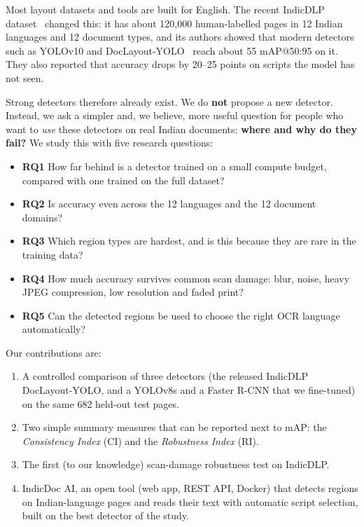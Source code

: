 \documentclass[conference]{IEEEtran}
\begin{document}
Most layout datasets and tools are built for English. The recent IndicDLP dataset~\cite{indicdlp} changed this: it
has about 120{,}000 human-labelled pages in 12 Indian languages and 12 document types, and its authors showed that
modern detectors such as YOLOv10 and DocLayout-YOLO~\cite{doclayout} reach about 55 mAP@50:95 on it. They also
reported that accuracy drops by 20--25 points on scripts the model has not seen.

Strong detectors therefore already exist. We do \textbf{not} propose a new detector. Instead, we ask a simpler
and, we believe, more useful question for people who want to \emph{use} these detectors on real Indian documents:
\textbf{where and why do they fail?} We study this with five research questions:
\begin{itemize}
\item \textbf{RQ1} How far behind is a detector trained on a small compute budget, compared with one trained on the full dataset?
\item \textbf{RQ2} Is accuracy even across the 12 languages and the 12 document domains?
\item \textbf{RQ3} Which region types are hardest, and is this because they are rare in the training data?
\item \textbf{RQ4} How much accuracy survives common scan damage: blur, noise, heavy JPEG compression, low resolution and faded print?
\item \textbf{RQ5} Can the detected regions be used to choose the right OCR language automatically?
\end{itemize}

\noindent Our contributions are:
\begin{enumerate}
\item A controlled comparison of three detectors (the released IndicDLP DocLayout-YOLO, and a YOLOv8s and a Faster
R-CNN that we fine-tuned) on the same 682 held-out test pages.
\item Two simple summary measures that can be reported next to mAP: the \emph{Consistency Index} (CI) and the
\emph{Robustness Index} (RI).
\item The first (to our knowledge) scan-damage robustness test on IndicDLP.
\item IndicDoc AI, an open tool (web app, REST API, Docker) that detects regions on Indian-language pages and reads
their text with automatic script selection, built on the best detector of the study.
\end{enumerate}
\end{document}
